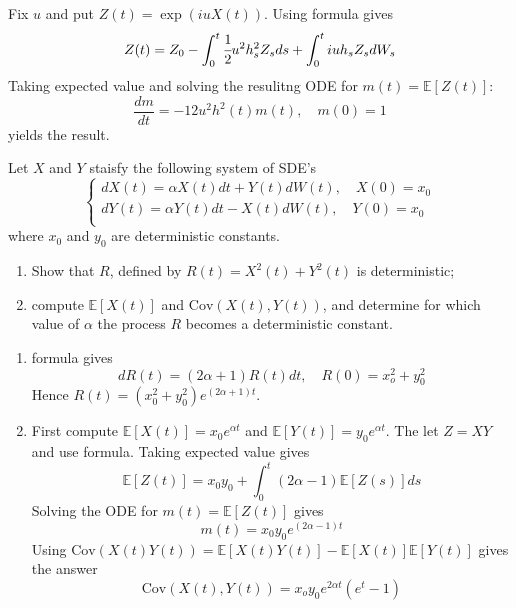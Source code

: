 \documentclass[12pt,a4paper]{exam}
\begin{document}
\begin{questions}
\begin{solution}
Fix $u$ and put $Z(t)=\exp (iuX(t))$. Using \ito formula gives
\begin{equation*}
Z(t) = Z_0 - \int_0^t \cfrac{1}{2}u^2h_s^2Z_s ds + \int_0^t iuh_sZ_sdW_s
\end{equation*}
Taking expected value and solving the resulitng ODE for $m(t)=\mathbb{E}[Z(t)]$:
\begin{equation*}
\frac{dm}{dt} = -{1}{2}u^2h^2(t)m(t), \quad m(0)=1
\end{equation*}
yields the result.
\end{solution}

\question Let $X$ and $Y$ staisfy the following system of SDE's
\begin{equation*}
\begin{cases}
dX(t) = \alpha X(t) dt + Y(t)dW(t), \quad X(0) = x_0\\
dY(t) = \alpha Y(t) dt - X(t)dW(t), \quad Y(0) = x_0\\
\end{cases}
\end{equation*}
where $x_0$ and $y_0$ are deterministic constants.
\begin{enumerate}[label=(\alph*),font=\itshape]
\item Show that $R$, defined by $R(t) = X^2(t)+Y^2(t)$ is deterministic;
\item compute $\mathbb{E}[X(t)]$ and $\text{Cov}(X(t), Y(t))$, and determine for which value of $\alpha$ the process $R$ becomes a deterministic constant.
\end{enumerate}
\fillwithlines{3cm}

\begin{solution}
\begin{enumerate}[label=(\alph*),font=\itshape]
\item \ito formula gives
\begin{equation*}
dR(t)=(2\alpha + 1)R(t)dt,\quad R(0)=x_o^2 + y_0^2
\end{equation*}
Hence $R(t) = (x_0^2 + y_0^2)e^{(2\alpha + 1)t}$.
\item First compute $\mathbb{E}[X(t)] = x_0e^{\alpha t}$ and  $\mathbb{E}[Y(t)] = y_0e^{\alpha t}$. The let $Z=XY$ and use \ito formula. Taking expected value gives
\begin{equation*} 
\mathbb{E}[Z(t)] = x_0y_0 + \int_0^t(2\alpha - 1)\mathbb{E}[Z(s)]ds
\end{equation*}
Solving the ODE for $m(t) = \mathbb{E}[Z(t)]$ gives 
\begin{equation*} 
m(t) = x_0y_0e^{(2\alpha - 1)t}
\end{equation*}
Using $\text{Cov}(X(t)Y(t))=\mathbb{E}[X(t)Y(t)]-\mathbb{E}[X(t)]\mathbb{E}[Y(t)]$ gives the answer
\begin{equation*} 
\text{Cov}(X(t), Y(t)) = x_oy_0e^{2\alpha t}(e^t - 1)
\end{equation*}
\end{enumerate}


\end{solution}
\end{questions}
\end{document}
